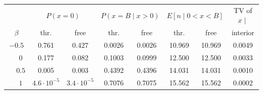 \begin{tabular}{c|cc|cc|cc|c}
 & \multicolumn{2}{c|}{$P(x=0)$} & \multicolumn{2}{c|}{$P(x=B\mid x>0)$} & \multicolumn{2}{c|}{$E[n\mid 0<x<B]$} & TV of $x\mid$\\
$\beta$ & thr. & free & thr. & free & thr. & free & interior\\\hline
$-0.5$ & 0.761 & 0.427 & 0.0026 & 0.0026 & 10.969 & 10.969 & 0.0049\\
$\phantom{-}0$ & 0.177 & 0.082 & 0.1003 & 0.0999 & 12.500 & 12.500 & 0.0033\\
$\phantom{-}0.5$ & 0.005 & 0.003 & 0.4392 & 0.4396 & 14.031 & 14.031 & 0.0010\\
$\phantom{-}1$ & $4.6\cdot 10^{-5}$ & $3.4\cdot 10^{-5}$ & 0.7076 & 0.7075 & 15.562 & 15.562 & 0.0002\\
\end{tabular}

